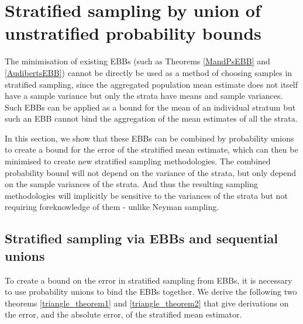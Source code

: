 
\section{Stratified sampling by union of unstratified probability bounds}\label{section:old_statistics}

The minimisation of existing EBBs (such as Theorems \ref{MandPsEBB} and \ref{AudibertsEBB}) cannot be directly be used as a method of choosing samples in stratified sampling, since the aggregated population mean estimate does not itself have a sample variance but only the strata have means and sample variances.
Such EBBs can be applied as a bound for the mean of an individual stratum but such an EBB cannot bind the aggregation of the mean estimates of all the strata.

In this section, we show that these EBBs can be combined by probability unions to create a bound for the error of the stratified mean estimate, which can then be minimised to create new stratified sampling methodologies.
The combined probability bound will not depend on the variance of the strata, but only depend on the sample variances of the strata.
And thus the resulting sampling methodologies will implicitly be sensitive to the variances of the strata but not requiring foreknowledge of them - unlike Neyman sampling.

\subsection{Stratified sampling via EBBs and sequential unions}\label{section:unionising_ebbs}

To create a bound on the error in stratified sampling from EBBs, it is necessary to use probability unions to bind the EBBs together.
We derive the following two theorems \ref{triangle_theorem1} and \ref{triangle_theorem2} that give derivations on the error, and the absolute error, of the stratified mean estimator.

